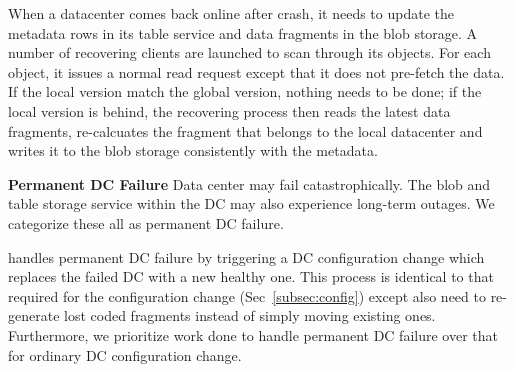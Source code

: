 When a datacenter comes back online after crash, it needs to update the
metadata rows in its table service and data fragments in the blob storage.
A number of recovering clients are launched to scan through its objects.
For each object, it issues a normal read request except that it does not
pre-fetch the data. If the local version match the global version, nothing
needs to be done; if the local version is behind, the recovering process
then reads the latest data fragments, re-calcuates the fragment that belongs
to the local datacenter and writes it to the blob storage consistently with
the metadata.


{\bf Permanent DC Failure}
Data center may fail catastrophically. The blob and table storage service
within the DC may also experience long-term outages. We categorize these all as
permanent DC failure.

\name handles permanent DC failure by triggering a DC configuration change 
which replaces the failed DC with a new healthy one. This process is identical 
to that required for the configuration change (Sec~\ref{subsec:config}) except
\name also need to re-generate lost coded fragments instead of simply moving
existing ones.  Furthermore, we prioritize work done to handle permanent DC
failure over that for ordinary DC configuration change.

%
%

